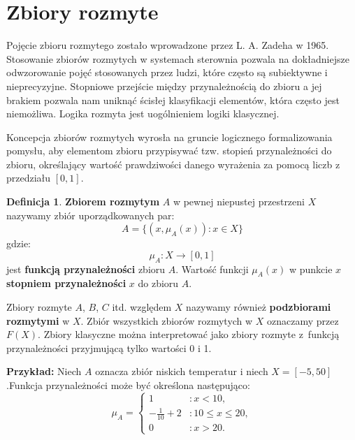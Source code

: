 \documentclass[a4paper,12pt]{article}
\theoremstyle{definition}
\newtheorem{df}{Definicja}
\begin{document}

\section{Zbiory rozmyte}
Pojęcie zbioru rozmytego zostało wprowadzone przez L. A. Zadeha w 1965. Stosowanie zbiorów rozmytych w systemach sterownia pozwala na dokładniejsze odwzorowanie pojęć stosowanych przez ludzi, które często są subiektywne i nieprecyzyjne. Stopniowe przejście między przynależnością do zbioru a jej brakiem pozwala nam uniknąć ścisłej klasyfikacji elementów, która często jest niemożliwa. Logika rozmyta jest uogólnieniem logiki klasycznej. 

Koncepcja zbiorów rozmytych wyrosła na gruncie logicznego formalizowania pomysłu, aby elementom zbioru przypisywać tzw. stopień przynależności do zbioru, określający wartość prawdziwości danego wyrażenia za pomocą liczb z przedziału $[0,1]$. 

\begin{df}
\textbf{Zbiorem rozmytym} $A$ w pewnej niepustej przestrzeni $X$ nazywamy zbiór uporządkowanych par:
\begin{equation}
    A = \{ (x, \mu_A (x))\colon x \in X \}
\end{equation}
gdzie:
\begin{equation}
   \mu_A \colon X \rightarrow [0,1]
\end{equation}
\noindent
jest \textbf{funkcją przynależności} zbioru $A$.
Wartość funkcji $\mu_A (x)$ w punkcie $x$ \textbf{stopniem przynależności} $x$ do zbioru $A$.
\end{df}


Zbiory rozmyte $A$, $B$, $C$ itd. względem $X$ nazywamy również \textbf{podzbiorami rozmytymi} w $X$.
Zbiór wszystkich zbiorów rozmytych w $X$ oznaczamy przez $F(X)$. Zbiory klasyczne można interpretować jako zbiory rozmyte z~funkcją przynależności przyjmującą tylko wartości 0 i 1.

\medskip
\noindent
{\bf Przykład:} Niech $A$ oznacza zbiór niskich temperatur i niech $X = [-5, 50]$.Funkcja przynależności może być określona następująco:
\begin{equation}
    \mu_A = 
    \left\{\begin{array}{ll}
 		1 & \colon  x<10,\\
 		-\frac{1}{10} +2  &\colon 10 \leqslant x \leqslant 20,\\
		 0 & \colon x>20.
	 \end{array}\right.
\end{equation}
\end{document}
